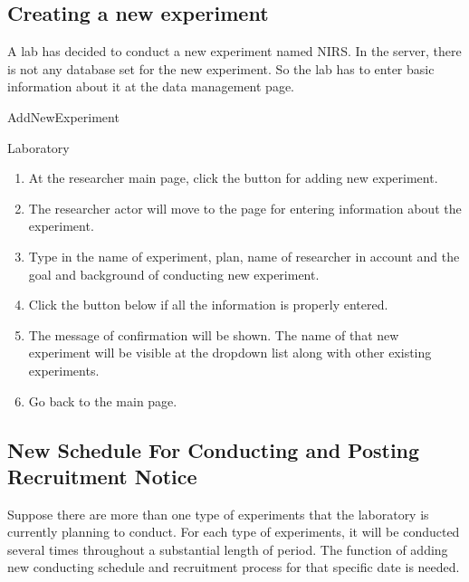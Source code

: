 \documentclass[letterpaper, 10 pt, conference]{ieeeconf}  %
\begin{document}
\subsection{Creating a new experiment}
A lab has decided to conduct a new experiment named NIRS. In the server, there is not any database set for the new experiment. So the lab has to enter basic information about it at the data management page.\\ 

AddNewExperiment\\

Laboratory\\

\begin{enumerate}
\item At the researcher main page, click the button for adding new experiment.
\item The researcher actor will move to the page for entering information about the experiment.
\item Type in the name of experiment, plan, name of researcher in account and the goal and background of conducting new experiment.
\item Click the button below if all the information is properly entered. 
\item The message of confirmation will be shown. The name of that new experiment will be visible at the dropdown list along with other existing experiments. 
\item Go back to the main page.
\end{enumerate}


\subsection{New Schedule For Conducting and Posting Recruitment Notice}
Suppose there are more than one type of experiments that the laboratory is currently planning to conduct. For each type of experiments, it will be conducted several times throughout a substantial length of period. The function of adding new conducting schedule and recruitment process for that specific date is needed. \\
\end{document}
